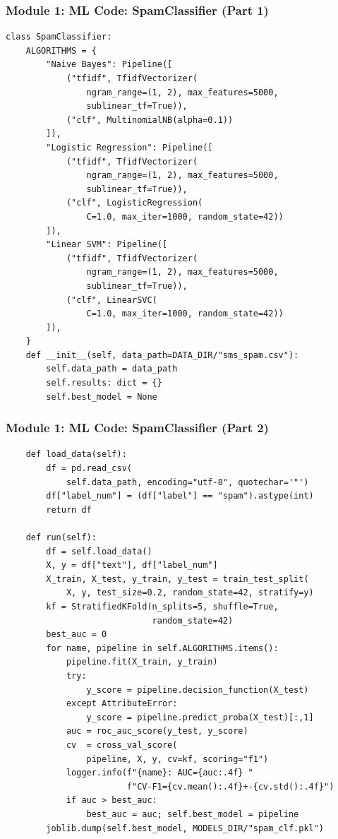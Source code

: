 \begin{frame}[fragile]\frametitle{Module 1: ML Code: SpamClassifier (Part 1)}
\begin{lstlisting}
class SpamClassifier:
    ALGORITHMS = {
        "Naive Bayes": Pipeline([
            ("tfidf", TfidfVectorizer(
                ngram_range=(1, 2), max_features=5000,
                sublinear_tf=True)),
            ("clf", MultinomialNB(alpha=0.1))
        ]),
        "Logistic Regression": Pipeline([
            ("tfidf", TfidfVectorizer(
                ngram_range=(1, 2), max_features=5000,
                sublinear_tf=True)),
            ("clf", LogisticRegression(
                C=1.0, max_iter=1000, random_state=42))
        ]),
        "Linear SVM": Pipeline([
            ("tfidf", TfidfVectorizer(
                ngram_range=(1, 2), max_features=5000,
                sublinear_tf=True)),
            ("clf", LinearSVC(
                C=1.0, max_iter=1000, random_state=42))
        ]),
    }
    def __init__(self, data_path=DATA_DIR/"sms_spam.csv"):
        self.data_path = data_path
        self.results: dict = {}
        self.best_model = None
\end{lstlisting}
\end{frame}

\begin{frame}[fragile]\frametitle{Module 1: ML Code: SpamClassifier (Part 2)}
\begin{lstlisting}
    def load_data(self):
        df = pd.read_csv(
            self.data_path, encoding="utf-8", quotechar='"')
        df["label_num"] = (df["label"] == "spam").astype(int)
        return df

    def run(self):
        df = self.load_data()
        X, y = df["text"], df["label_num"]
        X_train, X_test, y_train, y_test = train_test_split(
            X, y, test_size=0.2, random_state=42, stratify=y)
        kf = StratifiedKFold(n_splits=5, shuffle=True,
                             random_state=42)
        best_auc = 0
        for name, pipeline in self.ALGORITHMS.items():
            pipeline.fit(X_train, y_train)
            try:
                y_score = pipeline.decision_function(X_test)
            except AttributeError:
                y_score = pipeline.predict_proba(X_test)[:,1]
            auc = roc_auc_score(y_test, y_score)
            cv  = cross_val_score(
                pipeline, X, y, cv=kf, scoring="f1")
            logger.info(f"{name}: AUC={auc:.4f} "
                        f"CV-F1={cv.mean():.4f}+-{cv.std():.4f}")
            if auc > best_auc:
                best_auc = auc; self.best_model = pipeline
        joblib.dump(self.best_model, MODELS_DIR/"spam_clf.pkl")
\end{lstlisting}
\end{frame}


